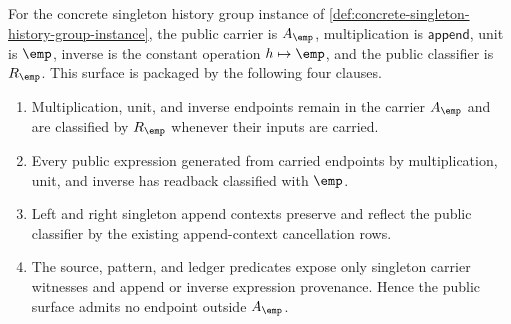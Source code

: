 \begin{theorem}
\label{thm:group-singleton-public-operation-surface}
For the concrete singleton history group instance of
\autoref{def:concrete-singleton-history-group-instance}, the public carrier is
$A_{\emp}$, multiplication is $\mathsf{append}$, unit is $\emp$, inverse is the
constant operation $h\mapsto\emp$, and the public classifier is $R_{\emp}$.
This surface is packaged by the following four clauses.
\begin{enumerate}
  \item Multiplication, unit, and inverse endpoints remain in the carrier
  $A_{\emp}$ and are classified by $R_{\emp}$ whenever their inputs are carried.

  \item Every public expression generated from carried endpoints by
  multiplication, unit, and inverse has readback classified with $\emp$.

  \item Left and right singleton append contexts preserve and reflect the
  public classifier by the existing append-context cancellation rows.

  \item The source, pattern, and ledger predicates expose only singleton
  carrier witnesses and append or inverse expression provenance. Hence the
  public surface admits no endpoint outside $A_{\emp}$.
\end{enumerate}
\end{theorem}
